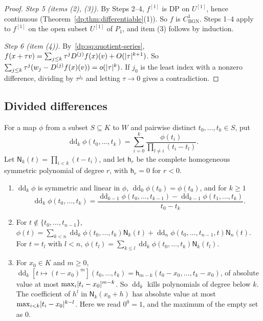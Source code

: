 \begin{proof}
\emph{Step 5 (items (2), (3)).} By Steps 2--4, $f^{[1]}$ is DP on $U^{[1]}$, hence continuous (Theorem~\ref{dp:thm:differentiable}(1)). So $f$ is $C^1_{\mathrm{BGN}}$. Steps 1--4 apply to $f^{[1]}$ on the open subset $U^{[1]}$ of $P_1$, and item (3) follows by induction.

\emph{Step 6 (item (4)).} By~\eqref{dp:sq:quotient-series}, $f(x+\tau v)=\sum_{j\le k}\tau^jD^{(j)}f(x)(v)+O(\lvert \tau\rvert^{k+1})$. So $\sum_{j\le k}\tau^j(w_j-D^{(j)}f(x)(v))=o(\lvert \tau\rvert^k)$. If $j_0$ is the least index with a nonzero difference, dividing by $\tau^{j_0}$ and letting $\tau\to0$ gives a contradiction.
\end{proof}

\subsection{Divided differences}\label{dp:sq:ssec-divided}

For a map $\phi$ from a subset $S\subseteq K$ to $W$ and pairwise distinct $t_0,\dots,t_k\in S$, put
\[
 \operatorname{dd}_k\phi(t_0,\dots,t_k)=\sum_{i=0}^k\frac{\phi(t_i)}{\prod_{l\ne i}(t_i-t_l)}.
\]
Let $\mathsf N_k(t)=\prod_{i<k}(t-t_i)$, and let $\mathsf h_r$ be the complete homogeneous symmetric polynomial of degree $r$, with $\mathsf h_r=0$ for $r<0$.

\begin{lemma}[interpolation]\label{dp:sq:interpolation}
\leavevmode
\begin{enumerate}
\item $\operatorname{dd}_k\phi$ is symmetric and linear in $\phi$, $\operatorname{dd}_0\phi(t_0)=\phi(t_0)$, and for $k\ge1$
\begin{equation}\label{dp:sq:dd-recursion}
 \operatorname{dd}_k\phi(t_0,\dots,t_k)=\frac{\operatorname{dd}_{k-1}\phi(t_0,\dots,t_{k-1})-\operatorname{dd}_{k-1}\phi(t_1,\dots,t_k)}{t_0-t_k}.
\end{equation}
\item For $t\notin\{t_0,\dots,t_{n-1}\}$,
$\phi(t)=\sum_{k<n}\operatorname{dd}_k\phi(t_0,\dots,t_k)\mathsf N_k(t)+\operatorname{dd}_n\phi(t_0,\dots,t_{n-1},t)\mathsf N_n(t)$. For $t=t_l$ with $l<n$, $\phi(t_l)=\sum_{k\le l}\operatorname{dd}_k\phi(t_0,\dots,t_k)\mathsf N_k(t_l)$.
\item For $x_0\in K$ and $m\ge0$, $\operatorname{dd}_k[t\mapsto(t-x_0)^m](t_0,\dots,t_k)=\mathsf h_{m-k}(t_0-x_0,\dots,t_k-x_0)$, of absolute value at most $\max_i\lvert t_i-x_0\rvert^{m-k}$. So $\operatorname{dd}_k$ kills polynomials of degree below $k$. The coefficient of $h^l$ in $\mathsf N_k(x_0+h)$ has absolute value at most $\max_{i<k}\lvert t_i-x_0\rvert^{k-l}$. Here we read $0^0=1$, and the maximum of the empty set as $0$.
\end{enumerate}
\end{lemma}

